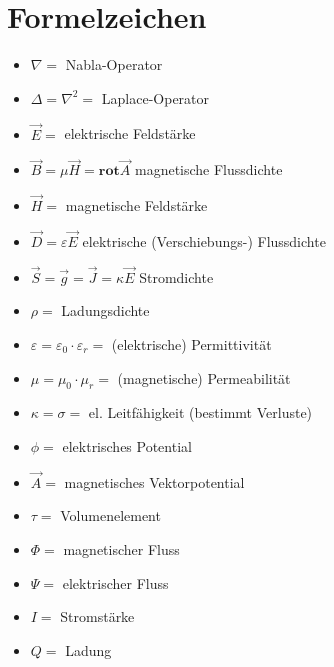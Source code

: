 \documentclass[german]{latex4ei/latex4ei_sheet}
\begin{document}
\section{Formelzeichen}
\begin{sectionbox}
    \begin{itemize}
        \item $\nabla = $ Nabla-Operator
        \item $\Delta = \nabla^2 = $ Laplace-Operator
        \item $\vec{E} = $ elektrische Feldstärke
        \item $\vec{B} = \mu \vec{H} = \mathbf{rot}\vec{A}$ magnetische Flussdichte
        \item $\vec{H} = $ magnetische Feldstärke
        \item $\vec{D} = \varepsilon \vec{E}$ elektrische (Verschiebungs-) Flussdichte
        \item $\vec{S} = \vec{g} = \vec{J} = \kappa \vec{E}   $ Stromdichte
        \item $\rho = $ Ladungsdichte
        \item $\varepsilon = \varepsilon_0 \cdot \varepsilon_r= $ (elektrische) Permittivität
        \item $ \mu = \mu_0 \cdot \mu_r = $ (magnetische) Permeabilität
        \item $ \kappa = \sigma = $ el. Leitfähigkeit (bestimmt Verluste)
        \item $\phi = $ elektrisches Potential
        \item $\vec{A} = $ magnetisches Vektorpotential
        \item $\tau = $ Volumenelement
        \item $\Phi = $ magnetischer Fluss
        \item $\Psi = $ elektrischer Fluss
        \item $I = $ Stromstärke
        \item $Q = $ Ladung
    \end{itemize}
\end{sectionbox}
\end{document}
